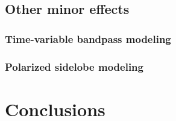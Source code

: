 \documentclass[twocolumn]{../../common/aa}
\begin{document}
\subsection{Other minor effects}
\label{sec:minor}

\subsubsection{Time-variable bandpass modeling}

\subsubsection{Polarized sidelobe modeling}


\section{Conclusions}
\label{sec:conclusions}
\end{document}
